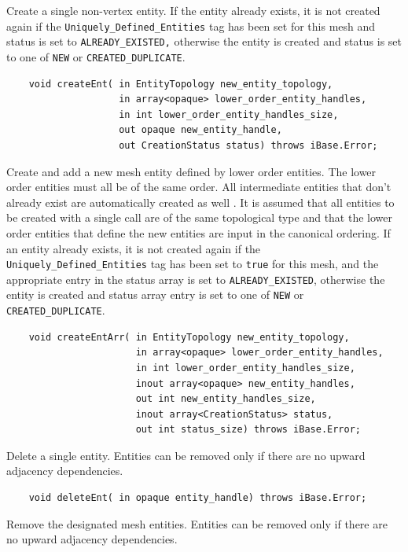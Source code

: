 \documentclass{article}
\begin{document}
Create a single non-vertex entity. If the entity already exists, 
it is not created again if the {\tt Uniquely\_Defined\_Entities} tag 
has been set for this mesh and status is set to {\tt ALREADY\_EXISTED,} 
otherwise the entity is created and status is set to one of {\tt NEW} 
or {\tt CREATED\_DUPLICATE}. 

\begin{verbatim}
    void createEnt( in EntityTopology new_entity_topology, 
                    in array<opaque> lower_order_entity_handles,  
                    in int lower_order_entity_handles_size, 
                    out opaque new_entity_handle,
                    out CreationStatus status) throws iBase.Error; 
\end{verbatim}

Create and add a new mesh entity defined by lower order entities. 
The lower order entities must all be of the same order. All intermediate 
entities that don't already exist are automatically created as 
well . It is assumed that all entities to be created with a single 
call are of the same topological type and that the lower order 
entities that define the new entities are input in the canonical 
ordering. If an entity already exists, it is not created again 
if the {\tt Uniquely\_Defined\_Entities} tag has been set to {\tt true} for 
this mesh, and the appropriate entry in the status array is set 
to {\tt ALREADY\_EXISTED}, otherwise the entity is created and status 
array entry is set to one of {\tt NEW} or {\tt CREATED\_DUPLICATE}. 

\begin{verbatim}
    void createEntArr( in EntityTopology new_entity_topology, 
                       in array<opaque> lower_order_entity_handles,  
                       in int lower_order_entity_handles_size, 
                       inout array<opaque> new_entity_handles,  
                       out int new_entity_handles_size,
                       inout array<CreationStatus> status, 
                       out int status_size) throws iBase.Error; 
\end{verbatim}

   Delete a single entity. Entities can be removed only if there 
are no upward adjacency dependencies.

\begin{verbatim}
    void deleteEnt( in opaque entity_handle) throws iBase.Error;
\end{verbatim}

Remove the designated mesh entities. Entities can be removed 
only if there are no upward adjacency dependencies.
\end{document}
